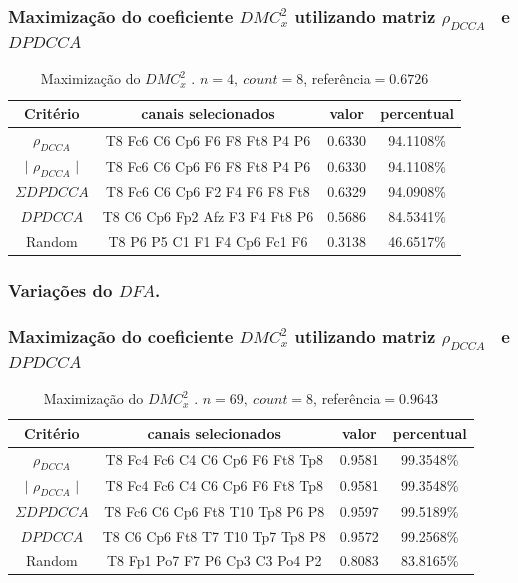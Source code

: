 \documentclass[11pt, aspectratio=169]{beamer}
\newcommand{\dmc}{\(DMC_x^2\) }
\newcommand{\pdcca}{\({\rho}_{DCCA}\) }
\newcommand{\dfa}{$DFA$}
\begin{document}
\begin{frame}
\frametitle{Maximização do coeficiente \dmc utilizando matriz \pdcca~e $DPDCCA$}
\begin{table}[h!]
    \centering
    \caption{Maximização do \dmc. $n=4,~ count=8$, referência$= 0.6726$} \label{tab:time_69}
    \begin{tabular}{c|c|c|c}
      \hline
      Critério & canais selecionados & valor & percentual \\
      \hline
      \hline
      \pdcca & T8 Fc6 C6 Cp6 F6 F8 Ft8 P4 P6 & 0.6330  & 94.1108\% \\
      $|$ \pdcca $|$ & T8 Fc6 C6 Cp6 F6 F8 Ft8 P4 P6  & 0.6330 & 94.1108\% \\
      $\Sigma DPDCCA$ & T8 Fc6 C6 Cp6 F2 F4 F6 F8 Ft8 & 0.6329 &  94.0908\% \\
      $DPDCCA$ & T8 C6 Cp6 Fp2 Afz F3 F4 Ft8 P6 & 0.5686 & 84.5341\% \\
      Random & T8 P6 P5 C1 F1 F4 Cp6 Fc1 F6 & 0.3138 & 46.6517\% \\
      
      \hline
    \end{tabular}
  \end{table}
\end{frame}

\frametitle{Variações do \dfa.}



\begin{frame}
\frametitle{Maximização do coeficiente \dmc utilizando matriz \pdcca~e $DPDCCA$}

  \begin{table}[h!]
    \centering
    \caption{Maximização do \dmc. $n=69,~ count=8$, referência$=0.9643 $} \label{tab:time_69}
    \begin{tabular}{c|c|c|c}
      \hline
      Critério & canais selecionados & valor & percentual \\
      \hline
      \hline
      \pdcca & T8 Fc4 Fc6 C4 C6 Cp6 F6 Ft8 Tp8 & 0.9581  & 99.3548\% \\
      $|$ \pdcca $|$ & T8 Fc4 Fc6 C4 C6 Cp6 F6 Ft8 Tp8  & 0.9581 & 99.3548\% \\
      $\Sigma DPDCCA$ & T8 Fc6 C6 Cp6 Ft8 T10 Tp8 P6 P8 & 0.9597 &  99.5189\% \\
      $DPDCCA$ & T8 C6 Cp6 Ft8 T7 T10 Tp7 Tp8 P8 & 0.9572 & 99.2568\% \\
      Random & T8 Fp1 Po7 F7 P6 Cp3 C3 Po4 P2 & 0.8083 & 83.8165\% \\
      \hline
    \end{tabular}
  \end{table}  

\end{frame}
\end{document}
